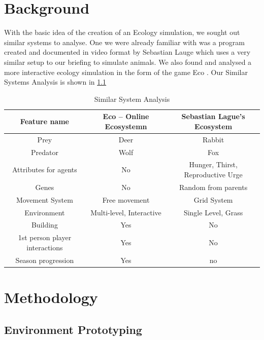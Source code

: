 \documentclass[a4paper, oneside, 11pt]{report}
\begin{document}
\chapter{Background}

With the basic idea of the creation of an Ecology simulation, we sought out similar systems to analyse.
One we were already familiar with was a program created and documented in video format by Sebastian Lauge \cite{SebastianLague} which uses a very similar setup to our briefing to simulate animals.
We also found and analysed a more interactive ecology simulation in the form of the game Eco \cite{EcoGame}.
Our Similar Systems Analysis is shown in \ref{table:nonlin}

\begin{table}[ht]
	\caption{Similar System Analysis} %
	\centering %
	\begin{tabular}{c c c} %
		\hline\hline %
		Feature name & Eco – Online Ecosystemn  & Sebastian Lague’s Ecosystem \\ [0.5ex] %
		\hline %
		Prey  & Deer  & Rabbit \\ %
		Predator  & Wolf  & Fox \\
		Attributes for agents  & No  & Hunger, Thirst, Reproductive Urge \\
		Genes  & No & Random from parents \\ 
		Movement System   & Free movement & Grid System \\ 
		Environment   & Multi-level, Interactive  & Single Level, Grass \\ 
		Building   & Yes & No \\
		1st person player interactions   & Yes & No\\
		Season progression   & Yes & no \\ [1ex] %
		\hline %
	\end{tabular}
	\label{table:nonlin} %
\end{table}

\chapter{Methodology}\label{MethLab}


\section{Environment Prototyping}
\end{document}
